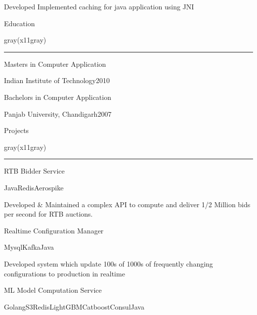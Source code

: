 \documentclass[10.5pt,a4paper]{article}
\begin{document}
\begin{multicols}{2}
\begin{desc}{Developed Implemented caching for java application using JNI}
\end{desc}
\vspace{4mm}
\begin{section}{Education}
\end{section}
\begin{color}{gray(x11gray)}\hrule\end{color}
\vspace{5mm}
\begin{expsec}{Masters in Computer Application}
\end{expsec}
\begin{expsubsec}{Indian Institute of Technology{\textbar}2010}
\end{expsubsec}
\begin{expsec}{Bachelors in Computer Application}
\end{expsec}
\begin{expsubsec}{Panjab University, Chandigarh{\textbar}2007}
\end{expsubsec}
\vspace{30mm}
\begin{section}{Projects}
\end{section}
\begin{color}{gray(x11gray)}\hrule\end{color}
\vspace{5mm}
\begin{expsec}{RTB Bidder Service}
\end{expsec}
\begin{expsubsec}{Java{\textbar}Redis{\textbar}Aerospike}
\end{expsubsec}
\begin{desc}{Developed \& Maintained a complex API to compute and deliver 1/2 Million bids per second for RTB auctions.}
\end{desc}
\begin{expsec}{Realtime Configuration Manager}
\end{expsec}
\begin{expsubsec}{Mysql{\textbar}Kafka{\textbar}Java}
\end{expsubsec}
\begin{desc}{Developed system which update 100s of 1000s of frequently changing configurations to production in realtime}
\end{desc}
\begin{expsec}{ML Model Computation Service}
\end{expsec}
\begin{expsubsec}{Golang{\textbar}S3{\textbar}Redis{\textbar}LightGBM{\textbar}Catboost{\textbar}Consul{\textbar}Java}

\end{expsubsec}
\end{multicols}
\end{document}
